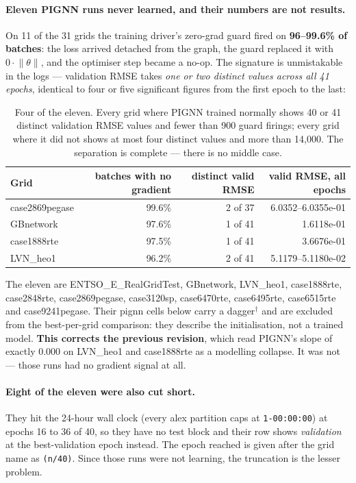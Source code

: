 \documentclass[10pt]{article}
\begin{document}
\paragraph{\textbf{Eleven PIGNN runs never learned, and their numbers are not
results.}} On 11 of the 31 grids the training driver's zero-grad guard fired on
\textbf{96--99.6\% of batches}: the loss arrived detached from the graph, the
guard replaced it with $0 \cdot \lVert\theta\rVert$, and the optimiser step
became a no-op. The signature is unmistakable in the logs --- validation RMSE
takes \emph{one or two distinct values across all 41 epochs}, identical to four or five
significant figures from the first epoch to the last:

\begin{table}[H]
\centering\small
\begin{tabular}{lrrr}
\toprule
Grid & batches with no gradient & distinct valid RMSE & valid RMSE, all epochs \\
\midrule
case2869pegase & 99.6\% & 2 of 37 & 6.0352--6.0355e-01 \\
GBnetwork      & 97.6\% & 1 of 41 & 1.6118e-01 \\
case1888rte    & 97.5\% & 1 of 41 & 3.6676e-01 \\
LVN\_heo1      & 96.2\% & 2 of 41 & 5.1179--5.1180e-02 \\
\bottomrule
\end{tabular}
\caption{Four of the eleven. Every grid where PIGNN trained normally shows 40 or
41 distinct validation RMSE values and fewer than 900 guard firings; every grid
where it did not shows at most four distinct values and more than 14{,}000. The
separation is complete --- there is no middle case.}
\end{table}

The eleven are ENTSO\_E\_RealGridTest, GBnetwork, LVN\_heo1, case1888rte,
case2848rte, case2869pegase, case3120sp, case6470rte, case6495rte, case6515rte
and case9241pegase. Their pignn cells below carry a dagger$^\dagger$ and are
excluded from the best-per-grid comparison: they describe the initialisation,
not a trained model. \textbf{This corrects the previous revision}, which read
PIGNN's slope of exactly 0.000 on LVN\_heo1 and case1888rte as a modelling
collapse. It was not --- those runs had no gradient signal at all.

\paragraph{Eight of the eleven were also cut short.} They hit the 24-hour wall
clock (every alex partition caps at \texttt{1-00:00:00}) at epochs 16 to 36 of
40, so they have no test block and their row shows \emph{validation} at the
best-validation epoch instead. The epoch reached is given after the grid name as
\texttt{(n/40)}. Since those runs were not learning, the truncation is the
lesser problem.
\end{document}
